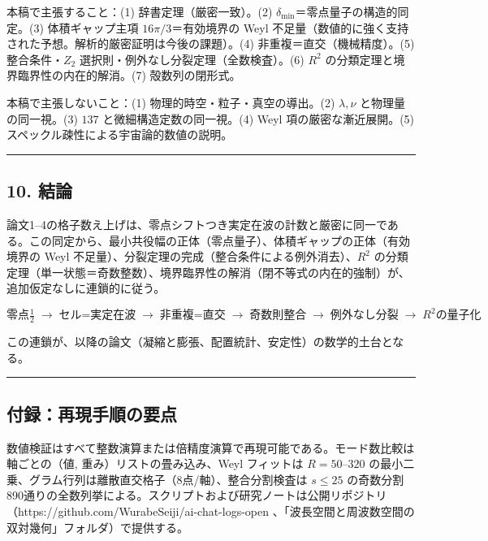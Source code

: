 \documentclass[
]{ltjsarticle}
\begin{document}
本稿で主張すること：(1) 辞書定理（厳密一致）。(2)
\(\delta_{\min}\)＝零点量子の構造的同定。(3) 体積ギャップ主項
\(16\pi/3\)＝有効境界の Weyl
不足量（数値的に強く支持された予想。解析的厳密証明は今後の課題）。(4)
非重複＝直交（機械精度）。(5) 整合条件・\(Z_2\)
選択則・例外なし分裂定理（全数検査）。(6) \(R^2\)
の分類定理と境界臨界性の内在的解消。(7) 殻数列の閉形式。

本稿で主張しないこと：(1) 物理的時空・粒子・真空の導出。(2)
\(\lambda,\nu\) と物理量の同一視。(3) \(137\)
と微細構造定数の同一視。(4) Weyl 項の厳密な漸近展開。(5)
スペックル疎性による宇宙論的数値の説明。

\begin{center}\rule{0.5\linewidth}{0.5pt}\end{center}

\subsection{10. 結論}\label{ux7d50ux8ad6}

論文1--4の格子数え上げは、零点シフトつき実定在波の計数と厳密に同一である。この同定から、最小共役幅の正体（零点量子）、体積ギャップの正体（有効境界の
Weyl 不足量）、分裂定理の完成（整合条件による例外消去）、\(R^2\)
の分類定理（単一状態＝奇数整数）、境界臨界性の解消（閉不等式の内在的強制）が、追加仮定なしに連鎖的に従う。

\[
\text{零点}\tfrac12\;\to\;\text{セル=実定在波}\;\to\;\text{非重複=直交}\;\to\;\text{奇数則整合}\;\to\;\text{例外なし分裂}\;\to\;R^2\text{の量子化}
\]

この連鎖が、以降の論文（凝縮と膨張、配置統計、安定性）の数学的土台となる。

\begin{center}\rule{0.5\linewidth}{0.5pt}\end{center}

\subsection{付録：再現手順の要点}\label{ux4ed8ux9332ux518dux73feux624bux9806ux306eux8981ux70b9}

数値検証はすべて整数演算または倍精度演算で再現可能である。モード数比較は軸ごとの（値,
重み）リストの畳み込み、Weyl フィットは \(R=50\)--\(320\)
の最小二乗、グラム行列は離散直交格子（8点/軸）、整合分割検査は
\(s\le25\)
の奇数分割890通りの全数列挙による。スクリプトおよび研究ノートは公開リポジトリ（https://github.com/WurabeSeiji/ai-chat-logs-open
、「波長空間と周波数空間の双対幾何」フォルダ）で提供する。
\end{document}
